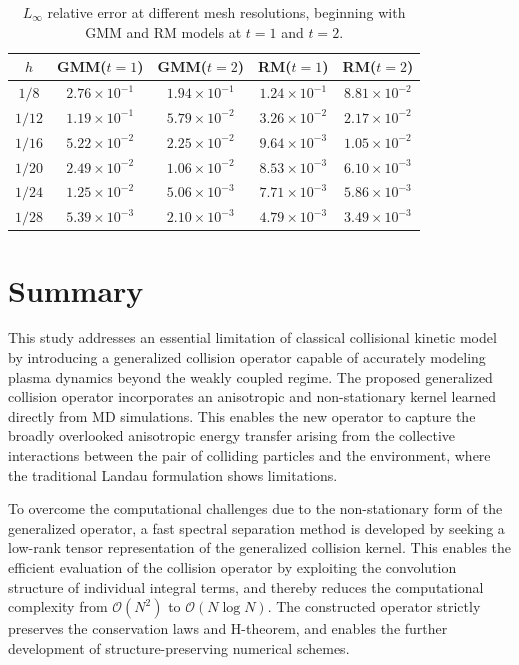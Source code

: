 \documentclass[preprint,1p,times]{elsarticle}
\newcommand{\cO}{\mathcal{O}}
\theoremstyle{definition}
\theoremstyle{remark}
\begin{document}
\begin{table}[H]
    \centering
    \begin{tabular}{c c c c c}
         $h$ & GMM($t=1$) & GMM($t=2$) & RM($t=1$) & RM($t=2$) \\\hline
         $1/8$ & $2.76\times 10^{-1}$ & $1.94\times 10^{-1}$ & $1.24\times 10^{-1}$ & $8.81\times 10^{-2}$ \\
         $1/12$ & $1.19\times 10^{-1}$ & $5.79\times 10^{-2}$ & $3.26\times 10^{-2}$ & $2.17\times 10^{-2}$ \\
         $1/16$ & $5.22\times 10^{-2}$ & $2.25\times 10^{-2}$ & $9.64\times 10^{-3}$ & $1.05\times 10^{-2}$ \\
         $1/20$ & $2.49\times 10^{-2}$ & $1.06\times 10^{-2}$ & $8.53\times 10^{-3}$ & $6.10\times 10^{-3}$ \\
         $1/24$ & $1.25\times 10^{-2}$ & $5.06\times 10^{-3}$ & $7.71\times 10^{-3}$ & $5.86\times 10^{-3}$ \\
         $1/28$ & $5.39\times 10^{-3}$ & $2.10\times 10^{-3}$ & $4.79\times 10^{-3}$ & $3.49\times 10^{-3}$ \\
    \end{tabular}
    \caption{$L_{\infty}$ relative error at different mesh resolutions, beginning with GMM and RM models at $t=1$ and $t=2$.}
    \label{table:errorLinf}
\end{table}


\section{Summary}\label{sec:summary}

This study addresses an essential limitation of classical collisional kinetic model by introducing a generalized collision operator capable of accurately modeling plasma dynamics beyond the weakly coupled regime.
The proposed generalized collision operator incorporates an anisotropic and non-stationary kernel learned directly from MD simulations. This enables the new operator to capture the broadly overlooked anisotropic energy transfer arising from the collective interactions between the pair of colliding particles and the environment, where the traditional Landau formulation shows limitations.

To overcome the computational challenges due to the non-stationary form of the generalized operator, a fast spectral separation method is developed by seeking a low-rank tensor representation of the generalized collision kernel. This enables the efficient evaluation of the collision operator by exploiting the convolution structure of individual integral terms, and thereby reduces the computational complexity from $\cO(N^{2})$ to $\cO(N \log N)$.
The constructed operator strictly preserves the conservation laws and H-theorem, and enables the further development of structure-preserving numerical schemes. 
\end{document}
